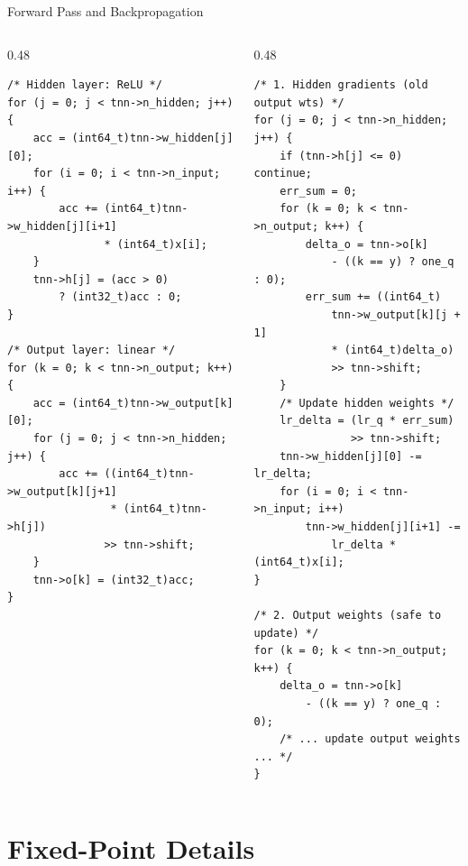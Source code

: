\documentclass[aspectratio=169, 10pt]{beamer}
\begin{document}
\begin{frame}[fragile]{Forward Pass and Backpropagation}
\begin{columns}[T]
\begin{column}{0.48\textwidth}
\begin{lstlisting}[style=cstyle,
  title={Forward pass (hidden + output)}]
/* Hidden layer: ReLU */
for (j = 0; j < tnn->n_hidden; j++) {
    acc = (int64_t)tnn->w_hidden[j][0];
    for (i = 0; i < tnn->n_input; i++) {
        acc += (int64_t)tnn->w_hidden[j][i+1]
               * (int64_t)x[i];
    }
    tnn->h[j] = (acc > 0)
        ? (int32_t)acc : 0;
}

/* Output layer: linear */
for (k = 0; k < tnn->n_output; k++) {
    acc = (int64_t)tnn->w_output[k][0];
    for (j = 0; j < tnn->n_hidden; j++) {
        acc += ((int64_t)tnn->w_output[k][j+1]
                * (int64_t)tnn->h[j])
               >> tnn->shift;
    }
    tnn->o[k] = (int32_t)acc;
}
\end{lstlisting}
\end{column}

\begin{column}{0.48\textwidth}
\begin{lstlisting}[style=cstyle,
  title={Backprop: hidden FIRST, then output}]
/* 1. Hidden gradients (old output wts) */
for (j = 0; j < tnn->n_hidden; j++) {
    if (tnn->h[j] <= 0) continue;
    err_sum = 0;
    for (k = 0; k < tnn->n_output; k++) {
        delta_o = tnn->o[k]
            - ((k == y) ? one_q : 0);
        err_sum += ((int64_t)
            tnn->w_output[k][j + 1]
            * (int64_t)delta_o)
            >> tnn->shift;
    }
    /* Update hidden weights */
    lr_delta = (lr_q * err_sum)
               >> tnn->shift;
    tnn->w_hidden[j][0] -= lr_delta;
    for (i = 0; i < tnn->n_input; i++)
        tnn->w_hidden[j][i+1] -=
            lr_delta * (int64_t)x[i];
}

/* 2. Output weights (safe to update) */
for (k = 0; k < tnn->n_output; k++) {
    delta_o = tnn->o[k]
        - ((k == y) ? one_q : 0);
    /* ... update output weights ... */
}
\end{lstlisting}
\end{column}
\end{columns}
\end{frame}

\section{Fixed-Point Details}
\end{document}
